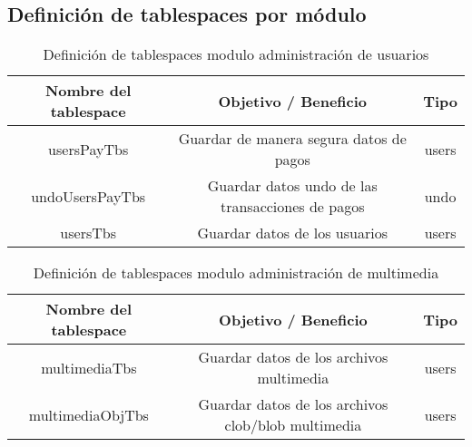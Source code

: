 \documentclass[journal]{IEEEtran}
\begin{document}
\subsection{Definición de tablespaces por módulo}
\begin{table}[H]
  \centering
  \begin{tabular}{|c|c|c|} 
   \hline
   Nombre del tablespace & Objetivo / Beneficio & Tipo \\ [0.000ex] 
   \hline
   usersPayTbs&Guardar de manera segura datos de pagos&users\\
   \hline
   undoUsersPayTbs&Guardar datos undo de las transacciones de pagos&undo\\
   \hline
   usersTbs&Guardar datos de los usuarios&users\\
   \hline
  \end{tabular}
  \caption{Definición de tablespaces modulo administración de usuarios}
  \label{tabla:7}
\end{table}
\begin{table}[H]
  \centering
  \begin{tabular}{|c|c|c|} 
   \hline
   Nombre del tablespace & Objetivo / Beneficio & Tipo \\ [0.000ex] 
   \hline
   multimediaTbs&Guardar datos de los archivos multimedia&users\\
   \hline
   multimediaObjTbs&Guardar datos de los archivos clob/blob multimedia&users\\
   \hline
  \end{tabular}
  \caption{Definición de tablespaces modulo administración de multimedia}
  \label{tabla:8}
\end{table}
\end{document}
